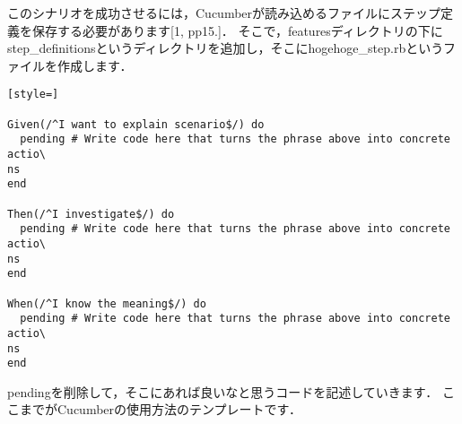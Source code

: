 このシナリオを成功させるには，Cucumberが読み込めるファイルにステップ定義を保存する必要があります[1, pp15.]．
そこで，featuresディレクトリの下にstep\_definitionsというディレクトリを追加し，そこにhogehoge\_step.rbというファイルを作成します．
\begin{lstlisting}[style=]

Given(/^I want to explain scenario$/) do
  pending # Write code here that turns the phrase above into concrete actio\
ns                                                                          
end

Then(/^I investigate$/) do
  pending # Write code here that turns the phrase above into concrete actio\
ns                                                                          
end

When(/^I know the meaning$/) do
  pending # Write code here that turns the phrase above into concrete actio\
ns                                                                          
end

\end{lstlisting}
pendingを削除して，そこにあれば良いなと思うコードを記述していきます．
ここまでがCucumberの使用方法のテンプレートです．

